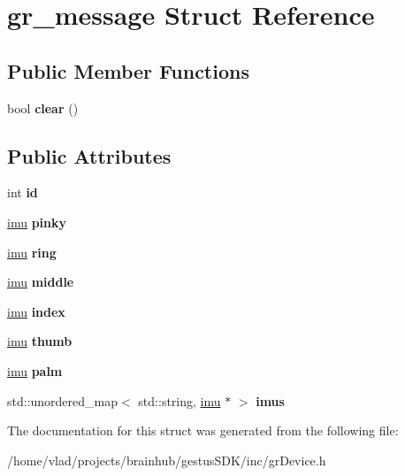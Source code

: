 \hypertarget{structgr__message}{}\section{gr\+\_\+message Struct Reference}
\label{structgr__message}
\subsection*{Public Member Functions}
\begin{DoxyCompactItemize}
\item 
\mbox{\label{structgr__message_ab1df69a5188f8c594e5c3116bc1e2f2a}} 
bool {\bfseries clear} ()
\end{DoxyCompactItemize}
\subsection*{Public Attributes}
\begin{DoxyCompactItemize}
\item 
\mbox{\label{structgr__message_a3725100d9e5d207cceecc5f5308d78a0}} 
int {\bfseries id}
\item 
\mbox{\label{structgr__message_a89059be54c454b6e595ec1edc2221e09}} 
\mbox{\hyperlink{structimu}{imu}} {\bfseries pinky}
\item 
\mbox{\label{structgr__message_a46cf80604fac242307667a5b84191d8c}} 
\mbox{\hyperlink{structimu}{imu}} {\bfseries ring}
\item 
\mbox{\label{structgr__message_ad064db84aad78718a0fa49b269a7cff6}} 
\mbox{\hyperlink{structimu}{imu}} {\bfseries middle}
\item 
\mbox{\label{structgr__message_a7a1bf7b6f5ef36909d9367419a3aaece}} 
\mbox{\hyperlink{structimu}{imu}} {\bfseries index}
\item 
\mbox{\label{structgr__message_ae414ed9059d5def115c26a370d92fc6e}} 
\mbox{\hyperlink{structimu}{imu}} {\bfseries thumb}
\item 
\mbox{\label{structgr__message_a2cba19162c0f25b6191827ea20c55d29}} 
\mbox{\hyperlink{structimu}{imu}} {\bfseries palm}
\item 
\mbox{\label{structgr__message_a6d67d3ee727d1ed7bd28cd765ed9cb72}} 
std\+::unordered\+\_\+map$<$ std\+::string, \mbox{\hyperlink{structimu}{imu}} $\ast$ $>$ {\bfseries imus}
\end{DoxyCompactItemize}


The documentation for this struct was generated from the following file\+:\begin{DoxyCompactItemize}
\item 
/home/vlad/projects/brainhub/gestus\+S\+D\+K/inc/gr\+Device.\+h\end{DoxyCompactItemize}
